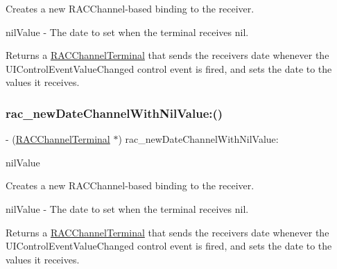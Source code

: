 Creates a new R\+A\+C\+Channel-\/based binding to the receiver.

nil\+Value -\/ The date to set when the terminal receives {\ttfamily nil}.

Returns a \mbox{\hyperlink{interface_r_a_c_channel_terminal}{R\+A\+C\+Channel\+Terminal}} that sends the receiver\textquotesingle{}s date whenever the U\+I\+Control\+Event\+Value\+Changed control event is fired, and sets the date to the values it receives. \mbox{\label{category_u_i_date_picker_07_r_a_c_signal_support_08_a705ad402ec1a4e421f24153a2f484f3f}} 
\subsubsection{\texorpdfstring{rac\+\_\+new\+Date\+Channel\+With\+Nil\+Value\+:()}{rac\_newDateChannelWithNilValue:()}\hspace{0.1cm}{\footnotesize\ttfamily [2/3]}}
{\footnotesize\ttfamily -\/ (\mbox{\hyperlink{interface_r_a_c_channel_terminal}{R\+A\+C\+Channel\+Terminal}} $\ast$) rac\+\_\+new\+Date\+Channel\+With\+Nil\+Value\+: \begin{DoxyParamCaption}\item[{(N\+S\+Date $\ast$)}]{nil\+Value }\end{DoxyParamCaption}}

Creates a new R\+A\+C\+Channel-\/based binding to the receiver.

nil\+Value -\/ The date to set when the terminal receives {\ttfamily nil}.

Returns a \mbox{\hyperlink{interface_r_a_c_channel_terminal}{R\+A\+C\+Channel\+Terminal}} that sends the receiver\textquotesingle{}s date whenever the U\+I\+Control\+Event\+Value\+Changed control event is fired, and sets the date to the values it receives. \mbox{\label{category_u_i_date_picker_07_r_a_c_signal_support_08_a705ad402ec1a4e421f24153a2f484f3f}} 
